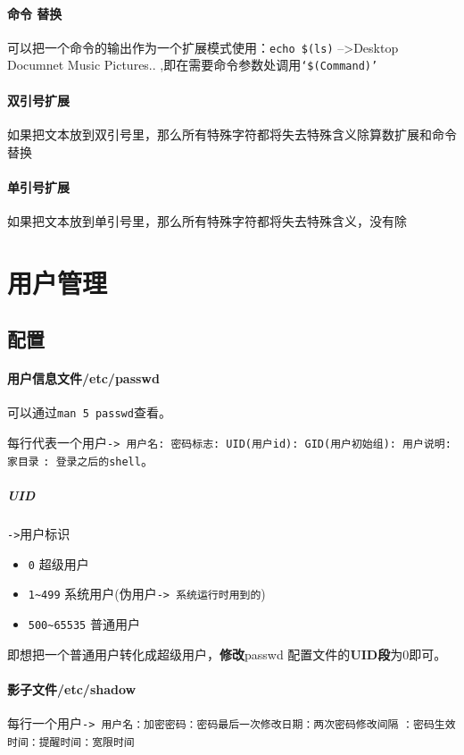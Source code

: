 \documentclass[UTF8,a4paper,12pt]{ctexbook}
\begin{document}
		\paragraph{命令  替换}可以把一个命令的输出作为一个扩展模式使用：\verb|echo $(ls)| -->Desktop Documnet Music Pictures.. ,即在需要命令参数处调用\verb|‘$(Command)’|
		\paragraph{双引号扩展}如果把文本放到双引号里，那么所有特殊字符都将失去特殊含义除算数扩展和命令替换
		\paragraph{单引号扩展}如果把文本放到单引号里，那么所有特殊字符都将失去特殊含义，没有除
		
	\section{用户管理}
		\subsection{配置}
			\paragraph{用户信息文件/etc/passwd}可以通过\verb|man 5 passwd|查看。
			
				每行代表一个用户\verb|-> 用户名: 密码标志: UID(用户id): GID(用户初始组): 用户说明: 家目录|
				\verb|: 登录之后的shell|。
			
				\subparagraph{UID}\verb|->|用户标识
					\begin{itemize}
						\item \verb|0| 超级用户
						\item \verb|1~499| 系统用户(伪用户\verb|-> 系统运行时用到的|)
						\item \verb|500~65535| 普通用户
					\end{itemize}
					
					即想把一个普通用户转化成超级用户，\textbf{修改}passwd 配置文件的\textbf{UID段}为0即可。
				
				
			\paragraph{影子文件/etc/shadow}
				每行一个用户\verb|-> 用户名：加密密码：密码最后一次修改日期：两次密码修改间隔|
				 \verb|：密码生效时间：提醒时间：宽限时间|
				 
\end{document}
